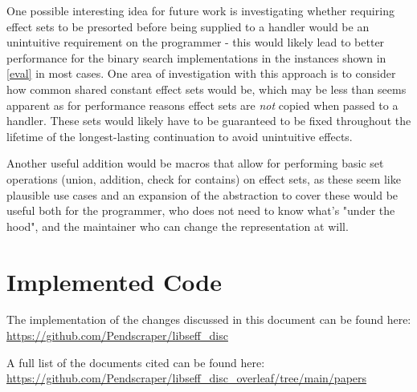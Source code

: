 \documentclass[logo,bsc,singlespacing,parskip,online]{infthesis}
\begin{document}
One possible interesting idea for future work is investigating whether requiring effect sets to be presorted before being supplied to a handler would be an unintuitive requirement on the programmer - this would likely lead to better performance for the binary search implementations in the instances shown in \cref{eval} in most cases. One area of investigation with this approach is to consider how common shared constant effect sets would be, which may be less than seems apparent as for performance reasons effect sets are \textit{not} copied when passed to a handler. These sets would likely have to be guaranteed to be fixed throughout the lifetime of the longest-lasting continuation to avoid unintuitive effects.

Another useful addition would be macros that allow for performing basic set operations (union, addition, check for contains) on effect sets, as these seem like plausible use cases and an expansion of the abstraction to cover these would be useful both for the programmer, who does not need to know what's "under the hood", and the maintainer who can change the representation at will.

% 
%
%

\printbibliography

\nocite{*}


\appendix

\chapter{Implemented Code} \label{appx}

The implementation of the changes discussed in this document can be found here: 
\url{https://github.com/Pendscraper/libseff_disc}

A full list of the documents cited can be found here:
\url{https://github.com/Pendscraper/libseff_disc_overleaf/tree/main/papers}


\end{document}
